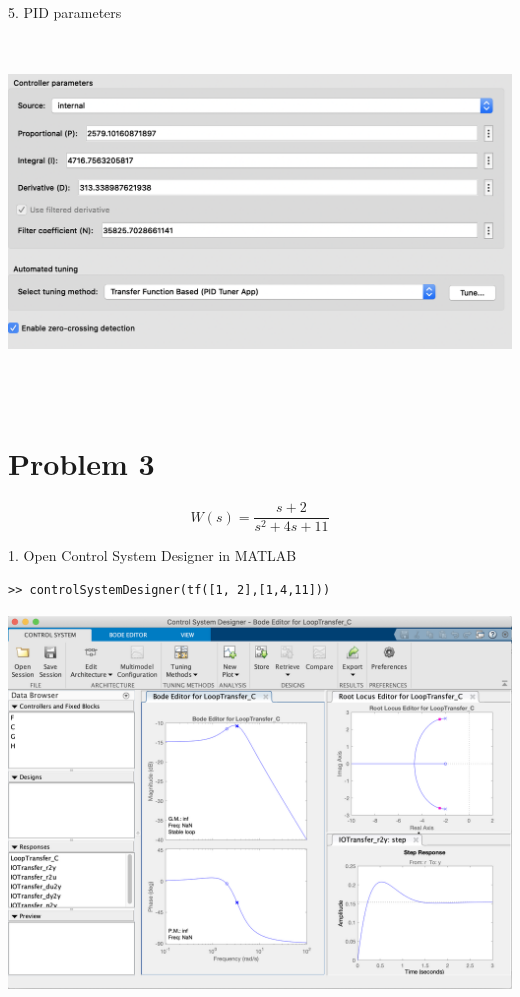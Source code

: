 \documentclass[a4paper,11pt]{article}
\makeatletter
\newcommand{\problemquestion}[1]{\gdef\@problemquestion{#1}}%
\theoremstyle{mytheor}
\makeatother
\begin{document}
$$$$
5. PID parameters
$$$$
\includegraphics[width=15.5cm, height=10cm]{PID_params.png}
$$$$



\section*{Problem 3}
$$W(s) = \frac{s+2}{s^2 + 4s + 11}$$
\begin{problem}
  \problemquestion{Design a lag or lead compensator (if applicable), play with zero and pole to find optimal values (of overshoot, peak time, transient process time, stationary error, etc.) for transient process. Use editors in Matlab Control System Designer.}
\end{problem}

1. Open Control System Designer in MATLAB
\begin{lstlisting}
>> controlSystemDesigner(tf([1, 2],[1,4,11]))
\end{lstlisting}
\includegraphics[width=15.5cm, height=10cm]{initial.png}
\end{document}
